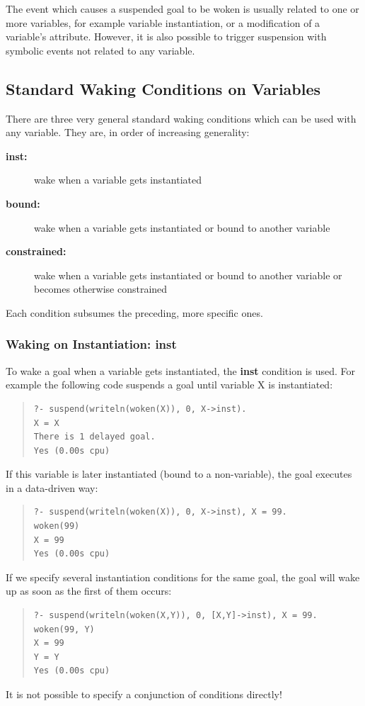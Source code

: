 The event which causes a suspended goal to be woken is usually
related to one or more variables, for example
variable instantiation, or a modification of a variable's
attribute.
However, it is also possible to trigger suspension with symbolic events
not related to any variable.


\subsection{Standard Waking Conditions on Variables}
\label{suspend}
\label{coroutining}%
There are three very general standard waking conditions which
can be used with any variable. They are, in order of increasing generality:
\begin{description}
\item[{\bf inst:}] wake when a variable gets instantiated
\item[{\bf bound:}] wake when a variable gets instantiated or bound to
        another variable
\item[{\bf constrained:}] wake when a variable gets instantiated or bound to
        another variable or becomes otherwise constrained 
\end{description}
Each condition subsumes the preceding, more specific ones.


\subsubsection{Waking on Instantiation: inst}

To wake a goal when a variable gets instantiated, the {\bf inst}
condition is used. For example the following code suspends a goal until
variable X is instantiated:
\begin{quote}\begin{verbatim}
?- suspend(writeln(woken(X)), 0, X->inst).
X = X
There is 1 delayed goal.
Yes (0.00s cpu)
\end{verbatim}\end{quote}
If this variable is later instantiated (bound to a non-variable),
the goal executes in a data-driven way:
\begin{quote}\begin{verbatim}
?- suspend(writeln(woken(X)), 0, X->inst), X = 99.
woken(99)
X = 99
Yes (0.00s cpu)
\end{verbatim}\end{quote}
If we specify several instantiation conditions for the same goal,
the goal will wake up as soon as the first of them occurs:
\begin{quote}\begin{verbatim}
?- suspend(writeln(woken(X,Y)), 0, [X,Y]->inst), X = 99.
woken(99, Y)
X = 99
Y = Y
Yes (0.00s cpu)
\end{verbatim}\end{quote}
It is not possible to specify a conjunction of conditions directly!

